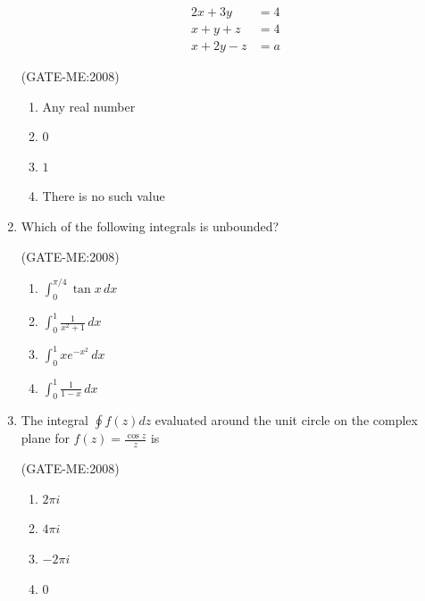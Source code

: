 \documentclass[journal,12pt,onecolumn]{IEEEtran}
\theoremstyle{remark}
\begin{document}
\begin{enumerate}
		\begin{align}
			2x + 3y &= 4 \\
			x + y + z &= 4 \\
			x + 2y - z &= a
                 \end{align}
               
        \hfill{(GATE-ME:2008)}
        \begin{multicols}{2}
            \begin{enumerate}
                \item Any real number
                \item $0$
                \item $1$
                \item There is no such value
            \end{enumerate}
        \end{multicols}
    
    \item
        Which of the following integrals is unbounded?

        \hfill{(GATE-ME:2008)}
        \begin{multicols}{2}
            \begin{enumerate}
                \item $\int_0^{\pi/4} \tan x \, dx$
                \item $\int_0^1 \frac{1}{x^2+1} \, dx$
                \item $\int_0^1 xe^{-x^2} \, dx$
                \item $\int_0^1 \frac{1}{1-x} \, dx$\\
            \end{enumerate}
        \end{multicols}

    \item
        The integral $\oint f(z) dz$ evaluated around the unit circle on the complex plane for $f(z) = \frac{\cos z}{z}$ is
       
       \hfill{(GATE-ME:2008)}
        \begin{multicols}{4}
            \begin{enumerate}
                \item $2\pi i$
                \item $4\pi i$
                \item $-2\pi i$
                \item $0$
            \end{enumerate}
        \end{multicols}
    

\end{enumerate}
\end{document}
